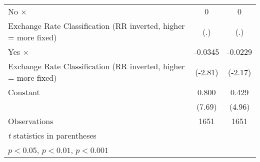 {\begin{tabular}{l*{2}{c}}
No $\times$     &        0         &        0         \\
Exchange Rate Classification (RR inverted, higher = more fixed)&      (.)         &      (.)         \\
\addlinespace
Yes $\times$    &  -0.0345\sym{**} &  -0.0229\sym{*}  \\
Exchange Rate Classification (RR inverted, higher = more fixed)&  (-2.81)         &  (-2.17)         \\
\addlinespace
Constant        &    0.800\sym{***}&    0.429\sym{***}\\
                &   (7.69)         &   (4.96)         \\
\midrule
Observations    &     1651         &     1651         \\
\bottomrule
\multicolumn{3}{l}{\footnotesize \textit{t} statistics in parentheses}\\
\multicolumn{3}{l}{\footnotesize \sym{*} \(p<0.05\), \sym{**} \(p<0.01\), \sym{***} \(p<0.001\)}\\
\end{tabular}
}
